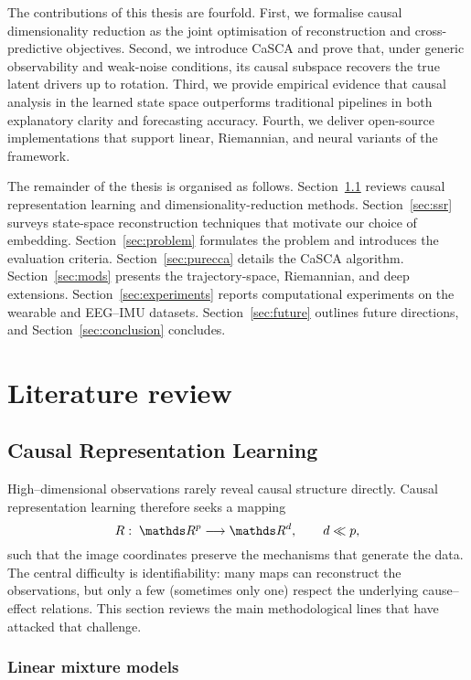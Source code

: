 \documentclass[14pt]{extarticle}
\begin{document}
	The contributions of this thesis are fourfold.  
	First, we formalise causal dimensionality reduction as the joint optimisation of reconstruction and cross-predictive objectives.  
	Second, we introduce CaSCA and prove that, under generic observability and weak-noise conditions, its causal subspace recovers the true latent drivers up to rotation.  
	Third, we provide empirical evidence that causal analysis in the learned state space outperforms traditional pipelines in both explanatory clarity and forecasting accuracy.  
	Fourth, we deliver open-source implementations that support linear, Riemannian, and neural variants of the framework.  
	
	The remainder of the thesis is organised as follows.  
	Section~\ref{sec:causal-dim-red} reviews causal representation learning and dimensionality-reduction methods.  
	Section~\ref{sec:ssr} surveys state-space reconstruction techniques that motivate our choice of embedding.  
	Section~\ref{sec:problem} formulates the problem and introduces the evaluation criteria.  
	Section~\ref{sec:purecca} details the CaSCA algorithm.  
	Section~\ref{sec:mods} presents the trajectory-space, Riemannian, and deep extensions.  
	Section~\ref{sec:experiments} reports computational experiments on the wearable and EEG–IMU datasets.  
	Section~\ref{sec:future} outlines future directions, and Section~\ref{sec:conclusion} concludes.  
	
	\section{Literature review}
	
	\subsection{Causal Representation Learning} \label{sec:causal-dim-red}
	High–dimensional observations rarely reveal causal structure directly.  
	Causal representation learning therefore seeks a mapping
	\[
	R:\;\dR^{p} \longrightarrow \dR^{d},
	\qquad d\ll p,
	\]
	such that the image coordinates preserve the mechanisms that generate the data.  
	The central difficulty is identifiability: many maps can reconstruct the observations, but only a few (sometimes only one) respect the underlying cause–effect relations.  
	This section reviews the main methodological lines that have attacked that challenge.
	
	\subsubsection*{Linear mixture models}
	
\end{document}
